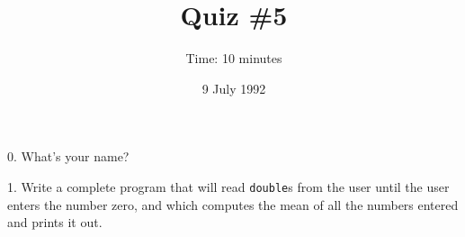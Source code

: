 

\topmargin -0.5in
\textheight 9in

\title{Quiz \#5}
\date{9 July 1992}
\author{Time: 10 minutes}


\maketitle

0. What's your name?

\vspace{.5in}

1.  Write a complete program that will read {\tt double}s from the user
until the user enters the number zero, and which computes the mean of
all the numbers entered and prints it out.


